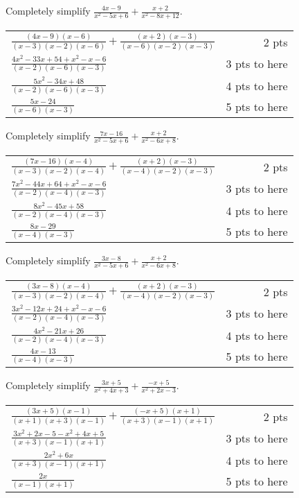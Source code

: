 {
	Completely simplify $\displaystyle \frac{4x-9}{x^2-5x+6} + \frac{x+2}{x^2-8x+12}$.
}
{
	\begin{tabular}{l r}
	$\frac{(4x-9)(x-6)}{(x-3)(x-2)(x-6)} + \frac{(x+2)(x-3)}{(x-6)(x-2)(x-3)}$ & 2 pts\\
	$\frac{4x^2-33x+54+x^2-x-6}{(x-2)(x-6)(x-3)}$ & 3 pts to here\\
	$\frac{5x^2-34x+48}{(x-2)(x-6)(x-3)}$ & 4 pts to here\\
	$\frac{5x-24}{(x-6)(x-3)}$ & 5 pts to here
	\end{tabular}
}

{
	Completely simplify $\displaystyle \frac{7x-16}{x^2-5x+6} + \frac{x+2}{x^2-6x+8}$.
}
{
	\begin{tabular}{l r}
	$\frac{(7x-16)(x-4)}{(x-3)(x-2)(x-4)} + \frac{(x+2)(x-3)}{(x-4)(x-2)(x-3)}$ & 2 pts\\
	$\frac{7x^2-44x+64+x^2-x-6}{(x-2)(x-4)(x-3)}$ & 3 pts to here\\
	$\frac{8x^2-45x+58}{(x-2)(x-4)(x-3)}$ & 4 pts to here\\
	$\frac{8x-29}{(x-4)(x-3)}$ & 5 pts to here
	\end{tabular}
}

{
	Completely simplify $\displaystyle \frac{3x-8}{x^2-5x+6} + \frac{x+2}{x^2-6x+8}$.
}
{
	\begin{tabular}{l r}
	$\frac{(3x-8)(x-4)}{(x-3)(x-2)(x-4)} + \frac{(x+2)(x-3)}{(x-4)(x-2)(x-3)}$ & 2 pts\\
	$\frac{3x^2-12x+24+x^2-x-6}{(x-2)(x-4)(x-3)}$ & 3 pts to here\\
	$\frac{4x^2-21x+26}{(x-2)(x-4)(x-3)}$ & 4 pts to here\\
	$\frac{4x-13}{(x-4)(x-3)}$ & 5 pts to here
	\end{tabular}
}

{
	Completely simplify $\displaystyle \frac{3x+5}{x^2+4x+3} + \frac{-x+5}{x^2+2x-3}$.
}
{
	\begin{tabular}{l r}
	$\frac{(3x+5)(x-1)}{(x+1)(x+3)(x-1)} + \frac{(-x+5)(x+1)}{(x+3)(x-1)(x+1)}$ & 2 pts\\
	$\frac{3x^2+2x-5-x^2+4x+5}{(x+3)(x-1)(x+1)}$ & 3 pts to here\\
	$\frac{2x^2+6x}{(x+3)(x-1)(x+1)}$ & 4 pts to here\\
	$\frac{2x}{(x-1)(x+1)}$ & 5 pts to here
	\end{tabular}
}
